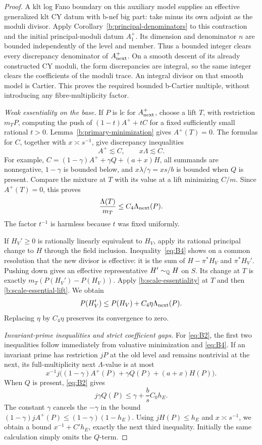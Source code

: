 \begin{proof}
A klt log Fano boundary on this auxiliary model supplies an effective
generalized klt CY datum with b-nef big part: take minus its own
adjoint as the moduli divisor.  Apply
Corollary~\ref{b:principal-denominators} to this contraction and the
initial principal-moduli datum $A_1^+$.  Its dimension and denominator
$n$ are bounded independently of the level and member.  Thus a
bounded integer clears every discrepancy denominator of
$A^+_{\rm next}$.  On a smooth descent of its already constructed CY
moduli, the form discrepancies are integral, so the same integer
clears the coefficients of the moduli trace.  An integral divisor on
that smooth model is Cartier.  This proves the required bounded
b-Cartier multiple, without introducing any fibre-multiplicity factor.

\smallskip\noindent
\emph{Weak essentiality on the base.}
If $P$ is lc for $A^+_{\rm next}$,
choose a lift $T$, with restriction $m_TP$, computing the push of
$(1-t)A^++tC$ for a fixed sufficiently small rational $t>0$.
Lemma~\ref{b:primary-minimization} gives $A^+(T)=0$.  The formulas for
$C$, together with $x\asymp s^{-1}$, give discrepancy inequalities
\[
                       A^+\lesssim C,\qquad x\Lambda\lesssim C.
\]
For example, $C=(1-\gamma)A^++\gamma Q+(a+x)H$, all summands are
nonnegative, $1-\gamma$ is bounded below, and
$x\lambda/\gamma=xs/b$ is bounded when $Q$ is present.
Compare the mixture at $T$ with its value at a lift minimizing $C/m$.
Since $A^+(T)=0$, this proves
\begin{equation}\label{b:scale-essential-lift}
            \frac{\Lambda(T)}{m_T}
                  \le C_4\Lambda_{\rm next}(P).
\end{equation}
The factor $t^{-1}$ is harmless because $t$ was fixed uniformly.

If $H_V'\ge0$ is rationally linearly equivalent to $H_V$, apply its
rational principal change to $H$ through the field inclusion.
Inequality~\eqref{eq:B4} shows on a common resolution that the new
divisor is effective: it is the sum of $H-\pi^*H_V$ and $\pi^*H_V'$.
Pushing down gives an effective representative $H'\sim_{\mathbb Q}H$ on $S$.
Its change at $T$ is exactly
$m_T(P(H_V')-P(H_V))$.  Apply \eqref{b:scale-essentiality} at $T$
and then \eqref{b:scale-essential-lift}.  We obtain
\[
           P(H_V')\le P(H_V)+C_4\eta\Lambda_{\rm next}(P).
\]
Replacing $\eta$ by $C_4\eta$ preserves its convergence to zero.

\smallskip\noindent
\emph{Invariant-prime inequalities and strict coefficient gaps.}
For \eqref{eq:B2}, the first two inequalities follow immediately from
valuative minimization and \eqref{eq:B4}.  If an invariant prime has
restriction $jP$ at the old level and remains nontrivial at the next,
its full-multiplicity next $\Lambda$-value is at most
\[
 x^{-1}j\bigl((1-\gamma)A^+(P)+\gamma Q(P)+(a+x)H(P)\bigr).
\]
When $Q$ is present, \eqref{eq:B2} gives
\[
 j\gamma Q(P)\le\gamma+\frac bsC_0h_E.
\]
The constant $\gamma$ cancels the $-\gamma$ in the bound
$(1-\gamma)jA^+(P)\le(1-\gamma)(1-h_E)$.  Using $jH(P)\le h_E$ and
$x\asymp s^{-1}$, we obtain a bound
$x^{-1}+C'h_E$, exactly the next third inequality.  Initially the
same calculation simply omits the $Q$-term.


\end{proof}
